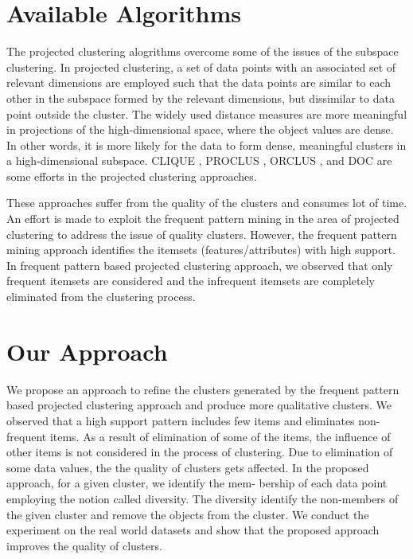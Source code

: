 \section{Available Algorithms}

The projected clustering\cite{bib1} alogrithms overcome some of the
issues of the subspace clustering. In projected clustering, a
set of data points with an associated set of relevant dimensions are employed such that the data points are similar to
each other in the subspace formed by the relevant dimensions, but dissimilar to data point outside the cluster. The
widely used distance measures are more meaningful in projections of the high-dimensional space, where the object
values are dense\cite{bib9}. In other words, it is more likely for the data
to form dense, meaningful clusters in a high-dimensional
subspace. CLIQUE \cite{bib3}, PROCLUS \cite{bib1}, ORCLUS \cite{bib2}, and DOC \cite{bib12} are some efforts in the projected clustering approaches.

These approaches suffer from the quality of the clusters and
consumes lot of time. An effort is made to exploit the frequent pattern mining in the area of projected clustering to
address the issue of quality clusters\cite{bib18, bib19}. However, the
frequent pattern mining\cite{bib4} approach identifies the itemsets
(features/attributes) with high support. In frequent pattern
based projected clustering approach, we observed that only
frequent itemsets are considered and the infrequent itemsets
are completely eliminated from the clustering process.

\section{Our Approach}

We propose an approach to refine the clusters
generated by the frequent pattern based projected clustering approach and produce more qualitative clusters. We
observed that a high support pattern includes few items
and eliminates non-frequent items.
As a result of elimination of some of the items, the influence of other items
is not considered in the process of clustering. Due to elimination of some
data values, the the quality of clusters gets affected. In the
proposed approach, for a given cluster, we identify the mem-
bership of each data point employing the notion called diversity. The diversity identify the non-members of the given
cluster and remove the objects from the cluster. We conduct
the experiment on the real world datasets and show that the
proposed approach improves the quality of clusters.
